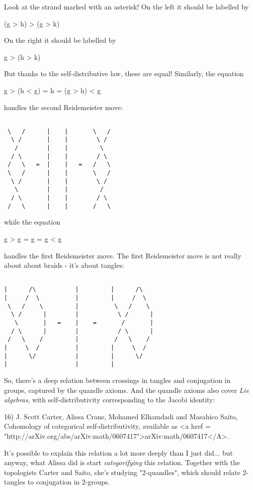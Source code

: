 Look at the strand marked with an asterisk!  On the left it should be
labelled by

(g > h) > (g > k)

On the right it should be labelled by 

g > (h > k)

But thanks to the self-distributive law, these are equal!  Similarly,
the equation 

g > (h < g) = h = (g > h) < g

handles the second Reidemeister move:


\begin{verbatim}

 \   /      |    |       \   / 
  \ /       |    |        \ /
   /        |    |         \  
  / \       |    |        / \  
 /   \   =  |    |   =   /   \  
 \   /      |    |       \   /
  \ /       |    |        \ /
   \        |    |         / 
  / \       |    |        / \ 
 /   \      |    |       /   \ 
\end{verbatim}
    
while the equation 

g > g = g = g < g

handles the first Reidemeister move.  The first Reidemeister move is
not really about about braids - it's about tangles: 


\begin{verbatim}

|      /\           |         |      /\
|     /  \          |         |     /  \
 \   /    \         |          \   /    \
  \ /      |        |           \ /      |
   \       |   =    |    =       /       |
  / \      |        |           / \      |
 /   \    /         |          /   \    /
|     \  /          |         |     \  / 
|      \/           |         |      \/
|                   |         |    
\end{verbatim}
    

So, there's a deep relation between crossings in tangles and
conjugation in groups, captured by the quandle axioms.  And the
quandle axioms also cover \emph{Lie algebras}, with self-distributivity
corresponding to the Jacobi identity:

16) J. Scott Carter, Alissa Crans, Mohamed Elhamdadi and Masahico
Saito, Cohomology of categorical self-distributivity, available
as <a href = "http://arXiv.org/abs/arXiv:math/0607417">arXiv:math/0607417</A>.

It's possible to explain this relation a lot more deeply than I just
did... but anyway, what Alissa did is start \emph{categorifying} this
relation.  Together with the topologists Carter and Saito, she's
studying "2-quandles", which should relate 2-tangles to
conjugation in 2-groups.

